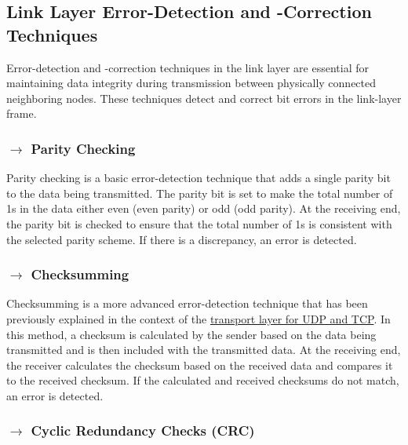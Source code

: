 \subsection[Link Layer Error-Detection and -Correction Techniques]{\hspace*{0.075 em}\raisebox{0.2 em}{$\pmb{\drsh}$} Link Layer Error-Detection and -Correction Techniques}
\label{subsec:link-layer-error-detection-correction}

Error-detection and -correction techniques in the link layer are essential for maintaining data integrity during transmission between physically connected neighboring nodes. These techniques detect and correct bit errors in the link-layer frame.

\subsubsection[Parity Checking]{$\pmb{\rightarrow}$ Parity Checking}

Parity checking is a basic error-detection technique that adds a single parity bit to the data being transmitted. The parity bit is set to make the total number of 1s in the data either even (even parity) or odd (odd parity). At the receiving end, the parity bit is checked to ensure that the total number of 1s is consistent with the selected parity scheme. If there is a discrepancy, an error is detected.

\subsubsection[Checksumming]{$\pmb{\rightarrow}$ Checksumming}

Checksumming is a more advanced error-detection technique that has been previously explained in the context of the \hyperref[subsubsec:checksum]{transport layer for UDP and TCP}. In this method, a checksum is calculated by the sender based on the data being transmitted and is then included with the transmitted data. At the receiving end, the receiver calculates the checksum based on the received data and compares it to the received checksum. If the calculated and received checksums do not match, an error is detected.

\subsubsection[Cyclic Redundancy Checks (CRC)]{$\pmb{\rightarrow}$ Cyclic Redundancy Checks (CRC)}

